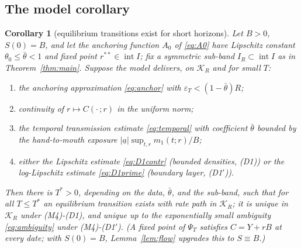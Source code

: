 \documentclass[11pt]{article}
\newtheorem{corollary}[theorem]{Corollary}
\theoremstyle{definition}
\theoremstyle{remark}
\newcommand{\ubar}[1]{\underline{#1}}
\newcommand{\Kcal}{\mathcal{K}}
\newcommand{\uba}{\ubar{a}}
\newcommand{\psit}{\Psi_T}
\begin{document}
\subsection{The model corollary}
\label{sec:verify}

\begin{corollary}[equilibrium transitions exist for short horizons]
\label{cor:model}
Let $B>0$, $S(0)=B$, and let the anchoring function $A_0$ of
\eqref{eq:A0} have Lipschitz constant
$\theta_0\le\bar\theta<1$ and fixed point
$r^{**}\in\operatorname{int}I$; fix a symmetric sub-band
$I_R\subset\operatorname{int}I$ as in Theorem~\ref{thm:main}.
Suppose the model delivers, on $\Kcal_R$ and for small $T$:
\begin{enumerate}[label=\textup{(M\arabic*)},leftmargin=3.2em]
\item the anchoring approximation \eqref{eq:anchor} with
$\varepsilon_T<(1-\bar\theta)R$;
\item continuity of $r\mapsto C(\cdot\,;r)$ in the uniform norm;
\item the temporal transmission estimate \eqref{eq:temporal} with
coefficient $\bar\theta$ bounded by the hand-to-mouth exposure
$|\uba|\sup_{t,r}m_1(t;r)/B$;
\item either the Lipschitz estimate \eqref{eq:D1contr} (bounded
densities, (D1)) or the log-Lipschitz estimate \eqref{eq:D1prime}
(boundary layer, (D1$'$)).
\end{enumerate}
Then there is $T^*>0$, depending on the data, $\bar\theta$, and the
sub-band, such that for all $T\le T^*$ an equilibrium transition
exists
with rate path in $\Kcal_R$; it is unique in $\Kcal_R$ under (M4)-(D1),
and unique up to the exponentially small ambiguity
\eqref{eq:ambiguity} under (M4)-(D1$'$). (A fixed point of
$\psit$ satisfies $C=Y+rB$ at every date; with $S(0)=B$,
Lemma~\ref{lem:flow} upgrades this to $S\equiv B$.)
\end{corollary}
\end{document}
